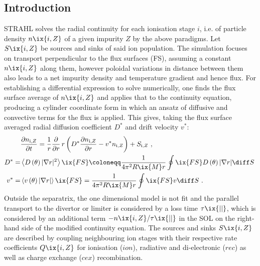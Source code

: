         \subsection{Introduction}\label{subsec:strahl}%
%
            STRAHL solves the radial continuity for each ionisation stage $i$, i.e. of particle density $n\ix{i,Z}$ of a given impurity $Z$ by the above paradigms. Let $S\ix{i,Z}$ be sources and sinks of said ion population. The simulation focuses on transport perpendicular to the flux surfaces (FS), assuming a constant $n\ix{i,Z}$ along them, however poloidal variations in distance between them also leads to a net impurity density and temperature gradient and hence flux. For establishing a differential expression to solve numerically, one finds the flux surface average of $n\ix{i,Z}$ and applies that to the continuity equation, producing a cylinder coordinate form in which an ansatz of diffusive and convective terms for the flux is applied. This gives, taking the flux surface averaged radial diffusion coefficient $D^{\ast}$ and drift velocity $v^{\ast}$:%
%
            \begin{align}%
                \begin{split}\label{eq:strahl_radtrans}%
                    &\frac{\partial n_{\text{i,}Z}}{\partial t}=\frac{1}{r}\frac{\partial}{\partial r}\,r\left(D^{\ast}\frac{\partial n_{\text{i,}Z}}{\partial r}-v^{\ast}n_{\text{i,}Z}\right)+S_{\text{i,}Z}\,\,,\\%
                    D^{\ast}=&\left\langle D\left(\theta\right)\vert \nabla r\vert^{2}\right\rangle\ix{FS}\coloneqq \frac{1}{4\pi^{2}R\ix{M}r}\displaystyle\oint\ix{FS}D\left(\theta\right)\vert\nabla r\vert\diff S\,\,\\%
                    v^{\ast}=&\left\langle v\left(\theta\right)\vert\nabla r\vert\right\rangle\ix{FS}=\frac{1}{4\pi^{2}R\ix{M}r}\displaystyle\oint\ix{FS}v\diff S\,\,.%
                \end{split}%
            \end{align}%
%
            Outside the separatrix, the one dimensional model is not fit and the parallel transport to the divertor or limiter is considered by a loss time $\tau\ix{||}$, which is considered by an additional term $-n\ix{i,Z}/\tau\ix{||}$ in the SOL on the right-hand side of the modified continuity equation. The sources and sinks $S\ix{i,Z}$ are described by coupling neighbouring ion stages with their respective rate coefficients $Q\ix{i,Z}$ for ionisation ($ion$), radiative and di-electronic ($rec$) as well as charge exchange ($cex$) recombination.
